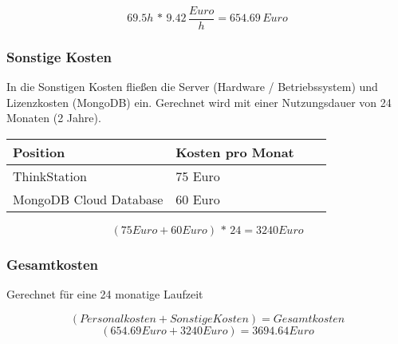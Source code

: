 	\[ 69.5h\,*\,9.42\,\frac{Euro}{h} = 654.69\,Euro \]


	\subsubsection{Sonstige Kosten}
	In die Sonstigen Kosten fließen die Server (Hardware / Betriebssystem) und Lizenzkosten (MongoDB) ein. Gerechnet wird mit einer Nutzungsdauer von 24 Monaten (2 Jahre).\\

	\begin{table}[htp]

		\begin{center}
			\begin{tabular}{llll} \toprule
				Position & Kosten pro Monat \\ \bottomrule
				ThinkStation & 75 Euro \\
				MongoDB Cloud Database & 60 Euro \\ \bottomrule
			\end{tabular}
		\end{center}
	\end{table}
	
	\[ (75 Euro + 60 Euro)\,*\,24 = 3240 Euro \]

	\subsubsection{Gesamtkosten}
	Gerechnet für eine 24 monatige Laufzeit
		
	\[ (Personalkosten + Sonstige Kosten) = Gesamtkosten \]
	\[ (654.69 Euro + 3240 Euro) = 3694.64 Euro \]